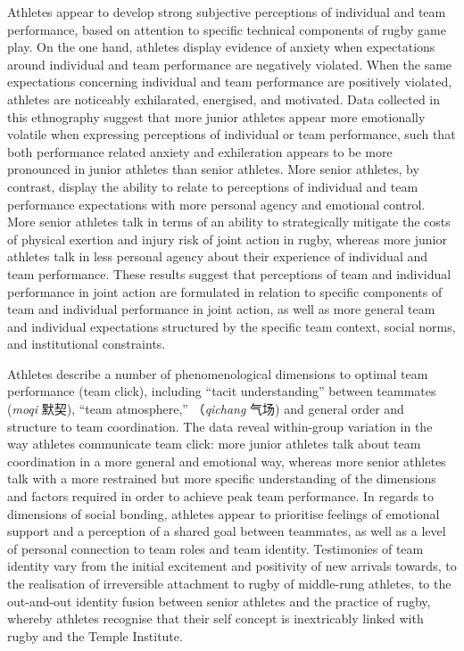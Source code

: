 Athletes appear to develop strong subjective perceptions of individual and team performance, based on attention to specific technical components of rugby game play.   On the one hand, athletes display evidence of anxiety when expectations around individual and team performance are negatively violated.  When the same expectations concerning individual and team performance are positively violated, athletes are noticeably exhilarated, energised, and motivated.  Data collected in this ethnography suggest that more junior athletes appear more emotionally volatile when expressing perceptions of individual or team performance, such that both performance related anxiety and exhileration appears to be more pronounced in junior athletes than senior athletes.  More senior athletes, by contrast, display the ability to relate to perceptions of individual and team performance expectations with more personal agency and emotional control.  More senior athletes talk in terms of an ability to strategically mitigate the costs of physical exertion and injury risk of joint action in rugby, whereas more junior athletes talk in less personal agency about their experience of individual and team performance.  These results suggest that perceptions of team and individual performance in joint action are formulated in relation to specific components of team and individual performance in joint action, as well as more general team and individual expectations structured by the specific team context, social norms, and institutional constraints.

Athletes describe a number of phenomenological dimensions to optimal team performance (team click), including ``tacit understanding'' between teammates (\textit{moqi} 默契), ``team atmosphere,'' （\textit{qichang} 气场) and general order and structure to team coordination.  The data reveal within-group variation in the way athletes communicate team click: more junior athletes talk about team coordination in a more general and emotional way, whereas more senior athletes talk with a more restrained but more specific understanding of the dimensions and factors required in order to achieve peak team performance.  In regards to dimensions of social bonding, athletes appear to prioritise feelings of emotional support and a perception of a shared goal between teammates, as well as a level of personal connection to team roles and team identity.  Testimonies of team identity vary from the initial excitement and positivity of new arrivals towards, to the realisation of irreversible attachment to rugby of middle-rung athletes, to the out-and-out identity fusion between senior athletes and the practice of rugby, whereby athletes recognise that their self concept is inextricably linked with rugby and the Temple Institute.

